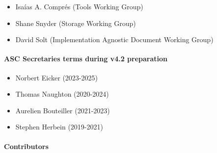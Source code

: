 \begin{itemize}
    \item Isaías A. Comprés (Tools Working Group)
    \item Shane Snyder (Storage Working Group)
    \item David Solt (Implementation Agnostic Document Working Group)
\end{itemize}

\paragraph*{ASC Secretaries terms during v4.2 preparation}

\begin{itemize}
    \item Norbert Eicker (2023-2025)
    \item Thomas Naughton (2020-2024)
    \item Aurelien Bouteiller (2021-2023)
    \item Stephen Herbein (2019-2021)
\end{itemize}

\paragraph*{Contributors}

